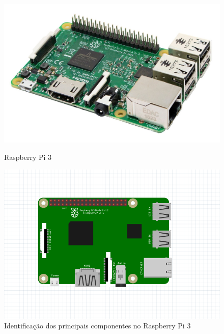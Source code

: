\newpage
\begin{figure}[h]
	\centering
	\begin{minipage}[b]{0.4\textwidth}
		\includegraphics[width=\textwidth]{img/hardware/rasp3-img.jpg}
		\caption{Raspberry Pi 3}
		\label{rasp1}
	\end{minipage}
	\hfill
	\begin{minipage}[b]{0.5\textwidth}
		\includegraphics[width=\textwidth]{img/hardware/rasp-esquema.PNG}
		\caption{Identificação dos principais componentes no Raspberry Pi 3 }
	\end{minipage}
\end{figure}




